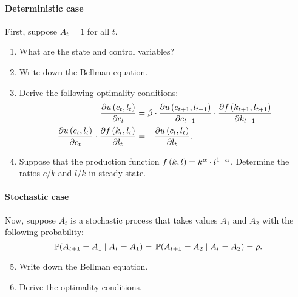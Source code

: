 \documentclass[letterpaper,12pt,leqno]{article}
\begin{document}
\paragraph{Deterministic case} First, suppose $A_{t}=1$ for all $t$.

\begin{enumerate}
\item What are the state and control variables?
\item  Write down the Bellman equation.
\item Derive the following optimality conditions: 
\begin{align*}
\frac{\partial u\left( c_{t},l_{t} \right)}{\partial  c_{t}} &=\beta \cdot \frac{\partial u\left( c_{t+1},l_{t+1} \right)}{\partial c_{t+1}} \cdot \frac{\partial f\left( k_{t+1},l_{t+1} \right)}{\partial  k_{t+1}}\\
\frac{\partial u\left( c_{t},l_{t} \right)}{\partial  c_{t}}\cdot \frac{\partial f\left( k_{t},l_{t} \right)}{\partial l_{t}} &=-\frac{\partial u\left( c_{t},l_{t} \right)}{\partial l_{t}}.
\end{align*}
\item Suppose that the production function $f\left( k,l \right) =k^{\alpha}\cdot l^{1-\alpha}$. Determine the ratios $c/k$ and $l/k$ in steady state.
\end{enumerate}

\paragraph{Stochastic case} Now, suppose $A_{t}$ is a stochastic process that takes values $A_{1}$ and $A_{2}$ with the following probability: 
\begin{equation*}
\P{A_{t+1}=A_{1}\mid A_{t}=A_{1}} =\P{A_{t+1}=A_{2}\mid A_{t}=A_{2}} =\rho .
\end{equation*}

\begin{enumerate}\setcounter{enumi}{4}
\item Write down the Bellman equation.
\item Derive the optimality conditions.
\end{enumerate}
\end{document}

